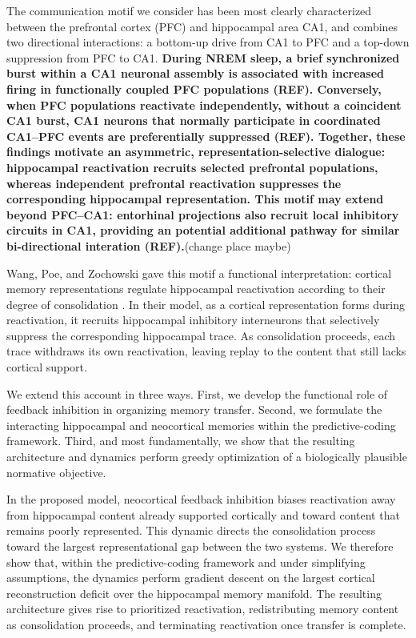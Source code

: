 \documentclass[10pt,letterpaper]{article}
\theoremstyle{plain}
\theoremstyle{remark}
\begin{document}
The communication motif we consider has been most clearly characterized between the prefrontal cortex (PFC) and hippocampal area CA1, and combines two directional interactions: a bottom-up drive from CA1 to PFC and a top-down suppression from PFC to CA1. \textbf{During NREM sleep, a brief synchronized burst within a CA1 neuronal assembly is associated with increased firing in functionally coupled PFC populations (REF). Conversely, when PFC populations reactivate independently, without a coincident CA1 burst, CA1 neurons that normally participate in coordinated CA1–PFC events are preferentially suppressed (REF). Together, these findings motivate an asymmetric, representation-selective dialogue: hippocampal reactivation recruits selected prefrontal populations, whereas independent prefrontal reactivation suppresses the corresponding hippocampal representation. This motif may extend beyond PFC–CA1: entorhinal projections also recruit local inhibitory circuits in CA1, providing an potential additional pathway for similar bi-directional interation (REF).}(change place maybe)

Wang, Poe, and Zochowski gave this motif a functional interpretation: cortical memory representations regulate hippocampal reactivation according to their degree of consolidation \cite{wang2008heterogeneities}. In their model, as a cortical representation forms during reactivation, it recruits hippocampal inhibitory interneurons that selectively suppress the corresponding hippocampal trace. As consolidation proceeds, each trace withdraws its own reactivation, leaving replay to the content that still lacks cortical support.

We extend this account in three ways. First, we develop the functional role of feedback inhibition in organizing memory transfer. Second, we formulate the interacting hippocampal and neocortical memories within the predictive-coding framework. Third, and most fundamentally, we show that the resulting architecture and dynamics perform greedy optimization of a biologically plausible normative objective.

In the proposed model, neocortical feedback inhibition biases reactivation away from hippocampal content already supported cortically and toward content that remains poorly represented. This dynamic directs the consolidation process toward the largest representational gap between the two systems. We therefore show that, within the predictive-coding framework and under simplifying assumptions, the dynamics perform gradient descent on the largest cortical reconstruction deficit over the hippocampal memory manifold. The resulting architecture gives rise to prioritized reactivation, redistributing memory content as consolidation proceeds, and terminating reactivation once transfer is complete.
\end{document}
